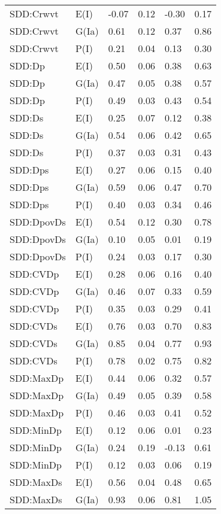 \begin{center}
\begin{longtable}{|p{1.1in}|p{0.7in}|p{0.7in}|p{0.6in}|p{0.6in}|p{0.6in}|}
  SDD:Crwvt & E(I) & -0.07 & 0.12 & -0.30 & 0.17 \\ 
  SDD:Crwvt & G(Ia) & 0.61 & 0.12 & 0.37 & 0.86 \\ 
  SDD:Crwvt & P(I) & 0.21 & 0.04 & 0.13 & 0.30 \\ 
  SDD:Dp & E(I) & 0.50 & 0.06 & 0.38 & 0.63 \\ 
  SDD:Dp & G(Ia) & 0.47 & 0.05 & 0.38 & 0.57 \\ 
  SDD:Dp & P(I) & 0.49 & 0.03 & 0.43 & 0.54 \\ 
  SDD:Ds & E(I) & 0.25 & 0.07 & 0.12 & 0.38 \\ 
  SDD:Ds & G(Ia) & 0.54 & 0.06 & 0.42 & 0.65 \\ 
  SDD:Ds & P(I) & 0.37 & 0.03 & 0.31 & 0.43 \\ 
  SDD:Dps & E(I) & 0.27 & 0.06 & 0.15 & 0.40 \\ 
  SDD:Dps & G(Ia) & 0.59 & 0.06 & 0.47 & 0.70 \\ 
  SDD:Dps & P(I) & 0.40 & 0.03 & 0.34 & 0.46 \\ 
  SDD:DpovDs & E(I) & 0.54 & 0.12 & 0.30 & 0.78 \\ 
  SDD:DpovDs & G(Ia) & 0.10 & 0.05 & 0.01 & 0.19 \\ 
  SDD:DpovDs & P(I) & 0.24 & 0.03 & 0.17 & 0.30 \\ 
  SDD:CVDp & E(I) & 0.28 & 0.06 & 0.16 & 0.40 \\ 
  SDD:CVDp & G(Ia) & 0.46 & 0.07 & 0.33 & 0.59 \\ 
  SDD:CVDp & P(I) & 0.35 & 0.03 & 0.29 & 0.41 \\ 
  SDD:CVDs & E(I) & 0.76 & 0.03 & 0.70 & 0.83 \\ 
  SDD:CVDs & G(Ia) & 0.85 & 0.04 & 0.77 & 0.93 \\ 
  SDD:CVDs & P(I) & 0.78 & 0.02 & 0.75 & 0.82 \\ 
  SDD:MaxDp & E(I) & 0.44 & 0.06 & 0.32 & 0.57 \\ 
  SDD:MaxDp & G(Ia) & 0.49 & 0.05 & 0.39 & 0.58 \\ 
  SDD:MaxDp & P(I) & 0.46 & 0.03 & 0.41 & 0.52 \\ 
  SDD:MinDp & E(I) & 0.12 & 0.06 & 0.01 & 0.23 \\ 
  SDD:MinDp & G(Ia) & 0.24 & 0.19 & -0.13 & 0.61 \\ 
  SDD:MinDp & P(I) & 0.12 & 0.03 & 0.06 & 0.19 \\ 
  SDD:MaxDs & E(I) & 0.56 & 0.04 & 0.48 & 0.65 \\ 
  SDD:MaxDs & G(Ia) & 0.93 & 0.06 & 0.81 & 1.05 \\ 

\end{longtable}
\end{center}
